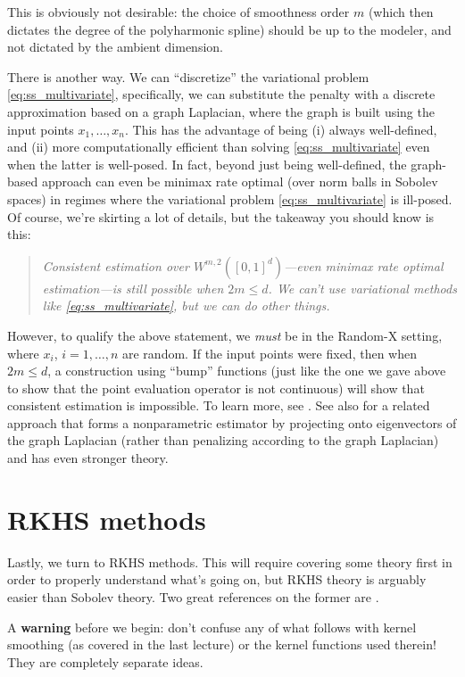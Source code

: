 \documentclass{article}
\begin{document}
This is obviously not desirable: the choice of smoothness order $m$ (which then
dictates the degree of the polyharmonic spline) should be up to the modeler, and
not dictated by the ambient dimension.

There is another way. We can ``discretize'' the variational problem
\eqref{eq:ss_multivariate}, specifically, we can substitute the penalty with a
discrete approximation based on a graph Laplacian, where the graph is built 
using the input points $x_1,\dots,x_n$. This has the advantage of being (i)
always well-defined, and (ii) more computationally efficient than solving
\eqref{eq:ss_multivariate} even when the latter is well-posed. In fact, beyond
just being well-defined, the graph-based approach can even be minimax rate
optimal (over norm balls in Sobolev spaces) in regimes where the variational
problem \eqref{eq:ss_multivariate} is ill-posed. Of course, we're skirting a lot
of details, but the takeaway you should know is this:  
\begin{quote}
\centering\it
Consistent estimation over $W^{m,2}([0,1]^d)$---even minimax rate optimal
estimation---is still possible when $2m \leq d$. We can't use variational
methods like \eqref{eq:ss_multivariate}, but we can do other things.
\end{quote}
However, to qualify the above statement, we \emph{must} be in the Random-X
setting, where $x_i$, $i=1,\dots,n$ are random. If the input points were fixed,
then when $2m \leq d$, a construction using ``bump'' functions (just like the
one we gave above to show that the point evaluation operator is not continuous)
will show that consistent estimation is impossible. To learn more, see 
\citet{green2021minimax1}. See also \citet{green2021minimax2} for a related
approach that forms a nonparametric estimator by projecting onto eigenvectors of 
the graph Laplacian (rather than penalizing according to the graph Laplacian)
and has even stronger theory.  

\section{RKHS methods}

Lastly, we turn to RKHS methods. This will require covering some theory first in
order to properly understand what's going on, but RKHS theory is arguably easier
than Sobolev theory. Two great references on the former are
\citet{scholkopf2002learning, christmann2008support}.  

A \textbf{warning} before we begin: don't confuse any of what follows with
kernel smoothing (as covered in the last lecture) or the kernel functions used
therein! They are completely separate ideas. 
\end{document}
